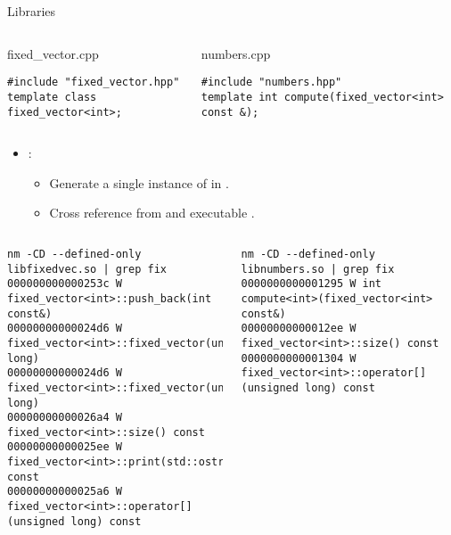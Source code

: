 \begin{frame}[t,fragile]{Libraries}
\begin{columns}[T]

\begin{block}{fixed\_vector.cpp}
\begin{lstlisting}[basicstyle=\tiny]
#include "fixed_vector.hpp"
template class fixed_vector<int>;
\end{lstlisting}
\end{block}

\begin{block}{numbers.cpp}
\begin{lstlisting}[basicstyle=\tiny]
#include "numbers.hpp"
template int compute(fixed_vector<int> const &);
\end{lstlisting}
\end{block}
\end{columns}

\begin{itemize}
  \item {}: 
    \begin{itemize}
      \item Generate a single instance of 
            in .
      \item Cross reference from  and executable .
    \end{itemize}
\end{itemize}

\begin{columns}[T]

\begin{lstlisting}[style=terminal=escapechar=@,basicstyle=\tiny]
nm -CD --defined-only libfixedvec.so | grep fix
000000000000253c W fixed_vector<int>::push_back(int const&)
00000000000024d6 W fixed_vector<int>::fixed_vector(unsigned long)
00000000000024d6 W fixed_vector<int>::fixed_vector(unsigned long)
00000000000026a4 W fixed_vector<int>::size() const
00000000000025ee W fixed_vector<int>::print(std::ostream&) const
00000000000025a6 W fixed_vector<int>::operator[](unsigned long) const
\end{lstlisting}

\begin{lstlisting}[style=terminal=escapechar=@,basicstyle=\tiny]
nm -CD --defined-only libnumbers.so | grep fix
0000000000001295 W int compute<int>(fixed_vector<int> const&)
00000000000012ee W fixed_vector<int>::size() const
0000000000001304 W fixed_vector<int>::operator[](unsigned long) const
\end{lstlisting}
\end{columns}
\end{frame}

